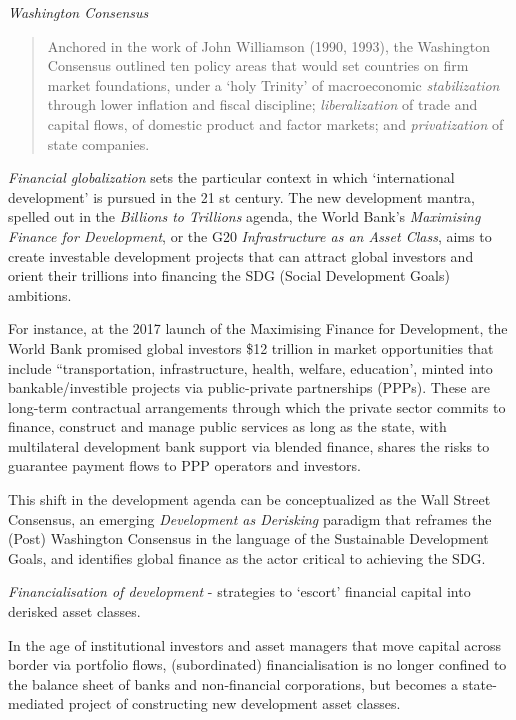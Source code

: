 \documentclass[
]{book}
\begin{document}
\emph{Washington Consensus}

\begin{quote}
Anchored in the work of John Williamson (1990, 1993),
the Washington Consensus outlined ten policy areas that would set countries on firm
market foundations, under a `holy Trinity' of macroeconomic \emph{stabilization} through
lower inflation and fiscal discipline; \emph{liberalization} of trade and capital flows, of
domestic product and factor markets; and \emph{privatization} of state companies.
\end{quote}

\emph{Financial globalization} sets the particular context in which
`international development' is pursued in the 21 st century.
The new development mantra, spelled out in the \emph{Billions to Trillions} agenda, the World
Bank's \emph{Maximising Finance for Development}, or the G20 \emph{Infrastructure as an Asset
Class}, aims to create investable development projects that can attract global investors
and orient their trillions into financing the SDG (Social Development Goals) ambitions.

For instance, at the 2017
launch of the Maximising Finance for Development, the World Bank promised global
investors \$12 trillion in market opportunities that include ``transportation,
infrastructure, health, welfare, education', minted into bankable/investible projects via
public-private partnerships (PPPs). These are long-term contractual arrangements
through which the private sector commits to finance, construct and manage public
services as long as the state, with multilateral development bank support via blended
finance, shares the risks to guarantee payment flows to PPP operators and investors.

This shift in the development agenda can be conceptualized as the Wall Street
Consensus, an emerging \emph{Development as Derisking} paradigm that reframes the (Post)
Washington Consensus in the language of the Sustainable
Development Goals, and identifies global finance as the actor critical to achieving the
SDG.

\emph{Financialisation of development} - strategies to `escort' financial capital
into derisked asset classes.

In the age of institutional investors
and asset managers that move capital across border via portfolio flows, (subordinated)
financialisation is no longer confined to the balance sheet of banks and non-financial
corporations, but becomes a state-mediated project of constructing new development
asset classes.
\end{document}
